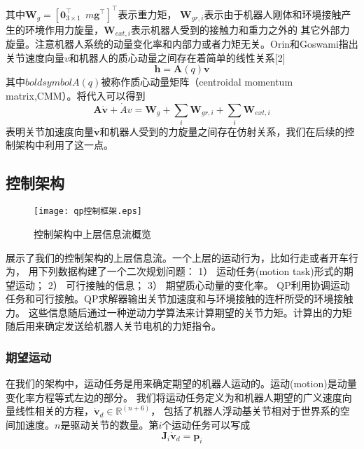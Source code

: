 其中${{\boldsymbol{W}}_{g}}={{[\mathbf{0}_{3\times 1}^{\top }\ \ m{{\mathbf{g}}^{\top }}]}^{\top }}$表示重力矩，
${\boldsymbol{W}}_{gr,i}$表示由于机器人刚体和环境接触产生的环境作用力旋量，${\boldsymbol{W}}_{ext,i}$表示机器人受到的接触力和重力之外的
其它外部力旋量。注意机器人系统的动量变化率和内部力或者力矩无关。Orin和Goswami指出关节速度向量$v$和机器人的质心动量之间存在着简单的线性关系[2]
\begin{equation}
    \label{equ:euler_linear_equ}
    \boldsymbol{h}=\boldsymbol{A}(q)\boldsymbol{v}
\end{equation}
其中$boldsymbol{A}(q)$被称作质心动量矩阵（centroidal momentum matrix,CMM）。将代入可以得到
\begin{equation}
    \label{equ:euler_wrench}
    \boldsymbol{A}\dot{\boldsymbol{v}}+\dot{A}v={{\boldsymbol{W}}_{g}}+\sum\limits_{i}{{{\boldsymbol{W}}_{gr,i}}}
    +\sum\limits_{i}{{{\boldsymbol{W}}_{ext,i}}}
\end{equation}
表明关节加速度向量$\dot{\boldsymbol{v}}$和机器人受到的力旋量之间存在仿射关系，我们在后续的控制架构中利用了这一点。

\subsection{控制架构}
\begin{figure}[htbp]
    \centering
    \texttt{[image: qp控制框架.eps]}
    \caption{\label{fig:framework_control_flow}控制架构中上层信息流概览}
\end{figure}
展示了我们的控制架构的上层信息流。一个上层的运动行为，比如行走或者开车行为，
用下列数据构建了一个二次规划问题：
1）	运动任务(motion task)形式的期望运动；
2）	可行接触的信息；
3）	期望质心动量的变化率。
QP利用协调运动任务和可行接触。QP求解器输出关节加速度和与环境接触的连杆所受的环境接触力。
这些信息随后通过一种逆动力学算法来计算期望的关节力矩。计算出的力矩随后用来确定发送给机器人关节电机的力矩指令。
\subsubsection{期望运动}
在我们的架构中，运动任务是用来确定期望的机器人运动的。运动(motion)是动量变化率方程等式左边的部分。
我们将运动任务定义为和机器人期望的广义速度向量线性相关的方程，${\dot{\boldsymbol{v}}}_{d}\in {\mathbb{R}}^{(n+6)}$，
包括了机器人浮动基关节相对于世界系的空间加速度。$n$是驱动关节的数量。第$i$个运动任务可以写成
\begin{equation}
    \label{equ:motion_task}
    \boldsymbol{J}_i \dot {\boldsymbol{v}}_d = \boldsymbol{p}_i
\end{equation}


